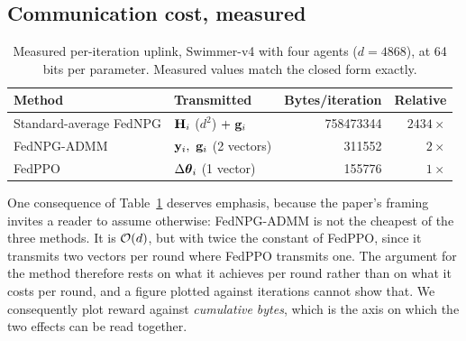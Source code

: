 \subsection{Communication cost, measured}

\begin{table}[t]
  \centering
  \caption{Measured per-iteration uplink, Swimmer-v4 with four agents
  ($d = \num{4868}$), at 64 bits per parameter. Measured values match the closed
  form exactly.}
  \label{tab:measuredcomm}
  \begin{tabular}{llrr}
    \toprule
    Method & Transmitted & Bytes/iteration & Relative \\
    \midrule
    Standard-average FedNPG & $\mathbf{H}_i$ ($d^2$) $+\ \mathbf{g}_i$ & \num{758473344} & $2434\times$ \\
    FedNPG-ADMM             & $\by_i,\ \bg_i$ (2 vectors) & \num{311552}   & $2\times$ \\
    FedPPO                  & $\Delta\boldsymbol{\theta}_i$ (1 vector)  & \num{155776}   & $1\times$ \\
    \bottomrule
  \end{tabular}
\end{table}

One consequence of Table~\ref{tab:measuredcomm} deserves emphasis, because the
paper's framing invites a reader to assume otherwise: FedNPG-ADMM is not the
cheapest of the three methods. It is $\mathcal{O}(d)$, but with twice the constant of
FedPPO, since it transmits two vectors per round where FedPPO transmits one.
The argument for the method therefore rests on what it achieves per round
rather than on what it costs per round, and a figure plotted against iterations
cannot show that. We consequently plot reward against \emph{cumulative bytes},
which is the axis on which the two effects can be read together.


